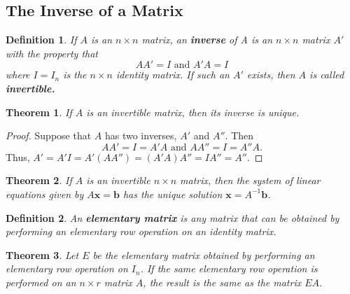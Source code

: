 \documentclass{article}
\newtheorem*{theorem*}{Theorem}
\newtheorem*{definition*}{Definition}
\newcommand{\vx}{\mathbf{x}}
\newcommand{\vb}{\mathbf{b}}
\begin{document}
\subsection{The Inverse of a Matrix}
\begin{definition*}
	If $A$ is an $n\times n$ matrix, an \textbf{\textit{inverse}} of A is an $n\times n$ matrix $A'$
	with the property that
	\[AA'=I \text{ and } A'A=I\]
	where $I=I_n$ is the $n\times n$ identity matrix. If such an $A'$ exists, then $A$ is called
	\textbf{\textit{invertible.}}
\end{definition*}
\begin{theorem*}
	If $A$ is an invertible matrix, then its inverse is unique.
\end{theorem*}
\begin{proof}
	Suppose that $A$ has two inverses, $A'$ and $A''$. Then
	\[AA'=I=A'A \text{ and } AA''=I=A''A.\]
	Thus, $A'=A'I=A'(AA'')=(A'A)A''=IA''=A''$.
\end{proof}
\begin{theorem*}
	If $A$ is an invertible $n\times n$ matrix, then the system of linear equations given by
	$A\vx=\vb$ has the unique solution $\vx=A^{-1}\vb$.
\end{theorem*}
\begin{definition*}
	An \textbf{\textit{elementary matrix}} is any matrix that can be obtained by performing an
	elementary row operation on an identity matrix.
\end{definition*}
\begin{theorem*}
	Let $E$ be the elementary matrix obtained by performing an elementary row operation on $I_n$. If
	the same elementary row operation is performed on an $n\times r$ matrix $A$, the result is the
	same as the matrix $EA$.
\end{theorem*}
\end{document}

